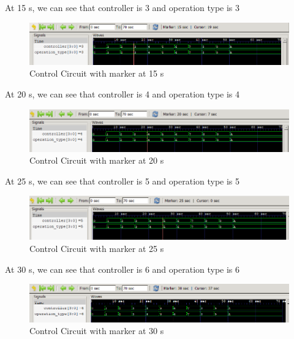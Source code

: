 \documentclass[12pt]{article}
\begin{document}
\newpage

At 15 s, we can see that controller is 3 and operation type is 3
\begin{figure}[h]
    \centering
    \includegraphics[width = 1.0\textwidth]{figs/CCirc15.png}
    \caption{Control Circuit with marker at 15 s}
    \label{fig:enter-label}
\end{figure}

At 20 s, we can see that controller is 4 and operation type is 4
\begin{figure}[h]
    \centering
    \includegraphics[width = 1.0\textwidth]{figs/CCirc20.png}
    \caption{Control Circuit with marker at 20 s}
    \label{fig:enter-label}
\end{figure}

At 25 s, we can see that controller is 5 and operation type is 5
\begin{figure}[h]
    \centering
    \includegraphics[width = 1.0\textwidth]{figs/CCirc25.png}
    \caption{Control Circuit with marker at 25 s}
    \label{fig:enter-label}
\end{figure}

\newpage

At 30 s, we can see that controller is 6 and operation type is 6
\begin{figure}[h]
    \centering
    \includegraphics[width = 1.0\textwidth]{figs/CCirc30.png}
    \caption{Control Circuit with marker at 30 s}
    \label{fig:enter-label}
\end{figure}
\end{document}
